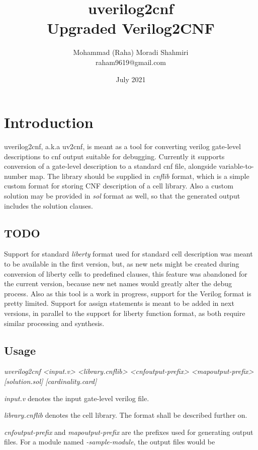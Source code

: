 \documentclass{article}
\title{uverilog2cnf\\Upgraded Verilog2CNF}
\date{July 2021}
\author{Mohammad (Raha) Moradi Shahmiri\\raham9619@gmail.com}
\begin{document}
	\maketitle
	\newpage


	\section{Introduction}
	uverilog2cnf, a.k.a uv2cnf, is meant as a tool for converting verilog gate-level descriptions to 
    cnf output suitable for debugging. Currently it supports conversion of a gate-level description to a standard 
    cnf file, alongside variable-to-number map. The library should be supplied in \textit{cnflib} format, which is a simple 
    custom format for storing CNF description of a cell library. Also a custom solution may be provided in \textit{sol} format 
    as well, so that the generated output includes the solution clauses. 

    \subsection{TODO}
    Support for standard \textit{liberty} format used for standard cell description was meant to be available in the first 
    version, but, as new nets might be created during conversion of liberty cells to predefined clauses, this feature was abandoned 
    for the current version, because new net names would greatly alter the debug process. Also as this tool is a work in progress, 
    support for the Verilog format is pretty limited. Support for assign statements is meant to be added in next versions, in parallel 
    to the support for liberty function format, as both require similar processing and synthesis. 

    \subsection {Usage}
    \textit{uverilog2cnf <input.v> <library.cnflib> <cnfoutput-prefix> <mapoutput-prefix> [solution.sol] [cardinality.card]}

    \textit{input.v} denotes the input gate-level verilog file.

    \textit{library.cnflib} denotes the cell library. The format shall be described further on.

    \textit{cnfoutput-prefix}  and \textit{mapoutput-prefix} are the prefixes used for generating output files. 
    For a module named \textit{-sample-module}, the output files would be 
\end{document}
